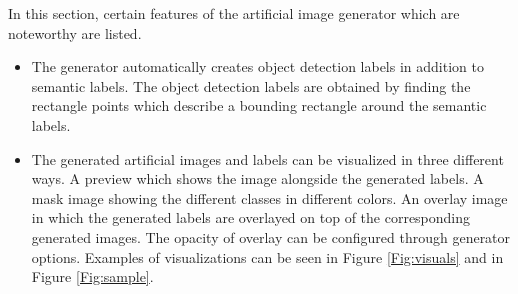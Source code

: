 In this section, certain features of the artificial image generator which are noteworthy are listed.
	\begin{itemize}
		\item The generator automatically creates object detection labels in addition to semantic labels. The object detection labels are obtained by finding the rectangle points which describe a bounding rectangle around the semantic labels.
		\item The generated artificial images and labels can be visualized in three different ways. A preview which shows the image alongside the generated labels. A mask image showing the different classes in different colors. An overlay image in which the generated labels are overlayed on top of the corresponding generated images. The opacity of overlay can be configured through generator options. Examples of visualizations can be seen in Figure \ref{Fig:visuals} and in Figure \ref{Fig:sample}.
		

\end{itemize}
